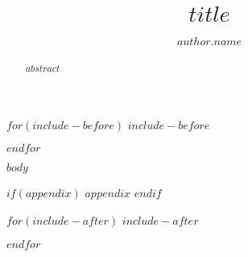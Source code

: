 \documentclass[a4paper,
               $if(lipics.anonymous)$anonymous,$endif$
               UKenglish,
               cleveref,
               autoref,
               thm-restate]{lipics-v2021}
\title{$title$}
\author{$author.name$}{$author.affiliation$}{$author.email$}{$author.orcid$}{$author.funding$}
\begin{document}
\maketitle

\begin{abstract}
    $abstract$
\end{abstract}

$for(include-before)$
$include-before$

$endfor$

$body$



$if(appendix)$
\appendix
$appendix$
$endif$

$for(include-after)$
$include-after$

$endfor$
\end{document}
